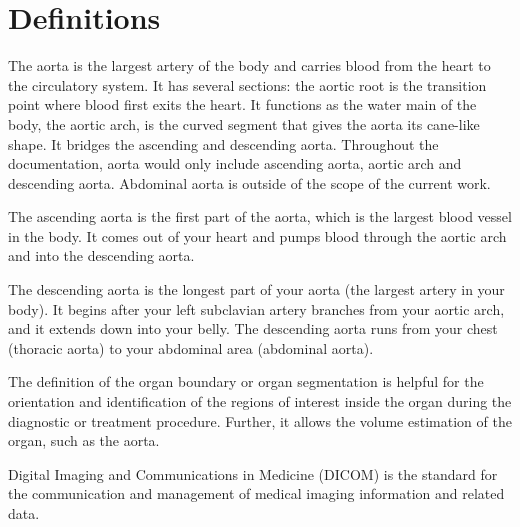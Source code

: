 

\section*{Definitions}
\begin{description}[font=\rmfamily\bfseries, leftmargin=3cm, style=nextline]
	\item[Aorta] The aorta is the largest artery of the body and carries blood from the heart to the circulatory system. It has several sections: the aortic root is the transition point where blood first exits the heart. It functions as the water main of the body, the aortic arch, is the curved segment that gives the aorta its cane-like shape. It bridges the ascending and descending aorta. Throughout the documentation, aorta would only include ascending aorta, aortic arch and descending aorta. Abdominal aorta is outside of the scope of the current work.
	\item[Ascending Aorta] The ascending aorta is the first part of the aorta, which is the largest blood vessel in the body. It comes out of your heart and pumps blood through the aortic arch and into the descending aorta.
	\item[Descending Aorta] The descending aorta is the longest part of your aorta (the largest artery in your body). It begins after your left subclavian artery branches from your aortic arch, and it extends down into your belly. The descending aorta runs from your chest (thoracic aorta) to your abdominal area (abdominal aorta).
	\item[Organ Segmentation] The definition of the organ boundary or organ segmentation is helpful for the orientation and identification of the regions of interest inside the organ during the diagnostic or treatment procedure. Further, it allows the volume estimation of the organ, such as the aorta.
	\item[DICOM] Digital Imaging and Communications in Medicine (DICOM) is the standard for the communication and management of medical imaging information and related data.

\end{description}
